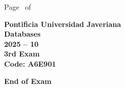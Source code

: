 \documentclass[11pt, addpoints, answers]{exam}\usepackage[utf8]{inputenc}
\begin{document}
\begin{coverpages}
\begin{center}
			\vspace{3mm}
			\leavevmode \hspace{5mm} 
		\end{center}
	\end{coverpages}

	\footer{} {Page \thepage\ of \numpages} {}

	\centering
	\textbf{\Large Pontificia Universidad Javeriana}\\
	\textbf{\Large Databases} \\
	\textbf{\large 2025 -- 10} \\
	\textbf{\large 3rd Exam} \\
	\textbf{Code: A6E901}


	\begin{questions}
		
		
		
		
		
		
		
		
		
		
		
		
		
		
		
		
		
		
		
		
	\end{questions}

	\vspace{5mm}
	\noindent \textbf{End of Exam}
\end{document}
